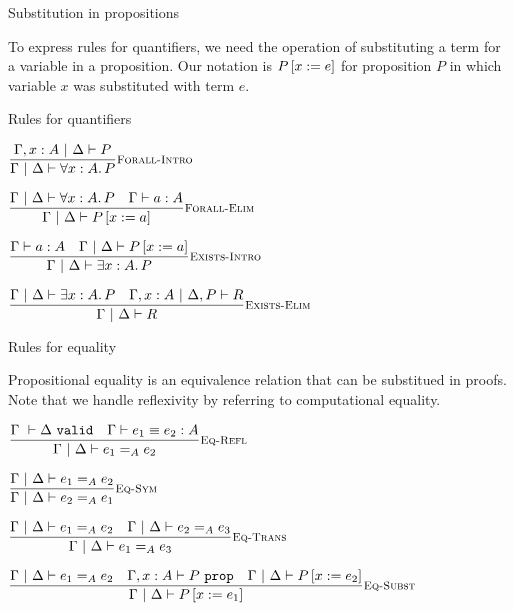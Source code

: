 \documentclass{beamer}
\begin{document}
\begin{frame}{Substitution in propositions}

To express rules for quantifiers, we need the operation of substituting a term for a variable in a proposition. Our notation is $P\left[x := e\right]$ for proposition $P$ in which variable $x$ was substituted with term $e$.

\end{frame}

\begin{frame}{Rules for quantifiers}

\begin{center}
  $\infrule[Forall-Intro]{\holds[\extend{\Gamma}{x}{A}][\Delta]{P}}{\holds{\All{x}[A]{P}}}$

  \vspace{2em}

  $\infrule[Forall-Elim]{\holds{\All{x}[A]{P}} \quad \typing{a}{A}}{\holds{\subst{P}{x}{a}}}$

  \vspace{2em}

  $\infrule[Exists-Intro]{\typing{a}{A} \quad \holds{\subst{P}{x}{a}}}{\holds{\Ex{x}[A]{P}}}$

  \vspace{2em}

  $\infrule[Exists-Elim]{\holds{\Ex{x}[A]{P}} \quad \holds[\extend{\Gamma}{x}{A}][\assume{\Delta}{P}]{R}}{\holds{R}}$
\end{center}

\end{frame}

\begin{frame}{Rules for equality}

Propositional equality is an equivalence relation that can be substitued in proofs. Note that we handle reflexivity by referring to computational equality.

\vspace{2em}

\begin{center}
  $\infrule[Eq-Refl]{\assctx{\Delta} \quad \compeq{e_1}{e_2}{A}}{\holds{\Eq[A]{e_1}{e_2}}}$

  \vspace{1em}

  $\infrule[Eq-Sym]{\holds{\Eq[A]{e_1}{e_2}}}{\holds{\Eq[A]{e_2}{e_1}}}$

  \vspace{1em}

  $\infrule[Eq-Trans]{\holds{\Eq[A]{e_1}{e_2}} \quad \holds{\Eq[A]{e_2}{e_3}}}{\holds{\Eq[A]{e_1}{e_3}}}$

  \vspace{1em}

  $\infrule[Eq-Subst]{\holds{\Eq[A]{e_1}{e_2}} \quad \prop[\extend{\Gamma}{x}{A}]{P} \quad \holds{\subst{P}{x}{e_2}}}{\holds{\subst{P}{x}{e_1}}}$
\end{center}

\end{frame}
\end{document}
